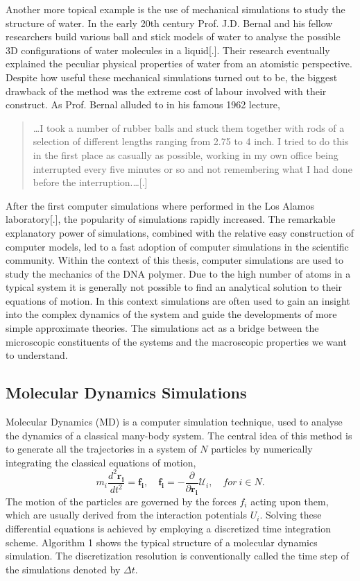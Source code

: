 Another more topical example is the use of mechanical simulations to study the
structure of water.  In the early 20th century Prof. J.D. Bernal and his fellow
researchers build various ball and stick models of water to analyse the possible 3D
configurations of water molecules in a liquid[.]. Their research eventually explained the
peculiar physical properties of water from an atomistic perspective. Despite how useful
these mechanical simulations turned out to be, the biggest drawback of the method was the
extreme cost of labour involved with their construct. As Prof. Bernal alluded to in his
famous 1962 lecture,

\begin{quote}
\dots I took a number of rubber balls and stuck them together with rods of a
selection of different lengths ranging from 2.75 to 4 inch. I tried to do this in the
first place as casually as possible, working in my own office being interrupted every
five minutes or so and not remembering what I had done before the interruption.\dots[.]
\end{quote}

After the first computer simulations where performed in the Los Alamos laboratory[.], the
popularity of simulations rapidly increased. The remarkable explanatory power of
simulations, combined with the relative easy construction of computer models, led to a
fast adoption of computer simulations in the scientific community. Within the context of
this thesis, computer simulations are used to study the mechanics of
the DNA polymer. Due to the high number of atoms in a typical system it is generally
not possible to find an analytical solution to their equations of motion. In this
context simulations are often used to gain an insight into the complex dynamics of the
system and guide the developments of more simple approximate theories. The simulations
act as a bridge between the microscopic constituents of the systems and the macroscopic
properties we want to understand.

\subsection{Molecular Dynamics Simulations}
Molecular Dynamics (MD) is a computer simulation technique, used to analyse
the dynamics of a classical many-body system. The central idea of this method is to
generate all the trajectories in a system of $N$ particles by numerically
integrating the classical equations of motion,
\[
m_i \frac{d^2 \boldsymbol{r_i}}{dt^2} = \boldsymbol{f_i}, \quad \boldsymbol{f_i} = -
    \frac{\partial}{\partial \boldsymbol{r_i}} \mathcal{U}_i, \quad for\ i \in N.
\]
The motion of the particles are governed by the forces $f_i$ acting upon them, which are
usually derived from the interaction potentials $U_i$.
Solving these differential equations is achieved by employing a discretized time
integration scheme.  Algorithm 1 shows the typical structure of a molecular dynamics
simulation. The discretization resolution is conventionally called the time step of the
simulations denoted by $\Delta t$.

